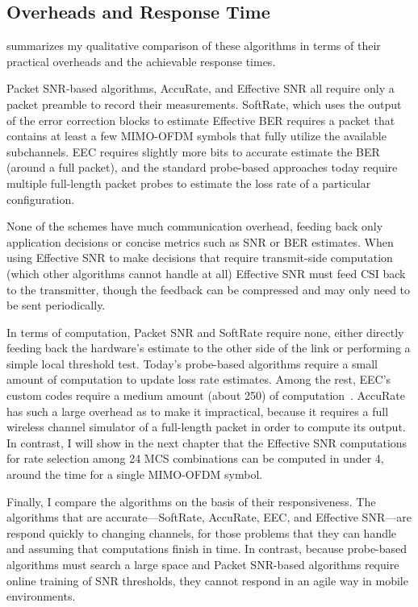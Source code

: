 \subsection{Overheads and Response Time}
 summarizes my qualitative comparison of these algorithms in terms of their practical overheads and the achievable response times.

Packet SNR-based algorithms, AccuRate, and Effective SNR all require only a packet preamble to record their measurements. SoftRate, which uses the output of the error correction blocks to estimate Effective BER requires a packet that contains at least a few MIMO-OFDM symbols that fully utilize the available subchannels. EEC requires slightly more bits to accurate estimate the BER (around a full packet), and the standard probe-based approaches today require multiple full-length packet probes to estimate the loss rate of a particular configuration.

None of the schemes have much communication overhead, feeding back only application decisions or concise metrics such as SNR or BER estimates. When using Effective SNR to make decisions that require transmit-side computation (which other algorithms cannot handle at all) Effective SNR must feed CSI back to the transmitter, though the feedback can be compressed and may only need to be sent periodically.

In terms of computation, Packet SNR and SoftRate require none, either directly feeding back the hardware's estimate to the other side of the link or performing a simple local threshold test. Today's probe-based algorithms require a small amount of computation to update loss rate estimates. Among the rest, EEC's custom codes require a medium amount (about 250\us) of computation~\cite{Chen_EEC}. AccuRate has such a large overhead as to make it impractical, because it requires a full wireless channel simulator of a full-length packet in order to compute its output. In contrast, I will show in the next chapter that the Effective SNR computations for rate selection among 24 MCS combinations can be computed in under 4\us, around the time for a single MIMO-OFDM symbol.

Finally, I compare the algorithms on the basis of their responsiveness. The algorithms that are accurate---SoftRate, AccuRate, EEC, and Effective SNR---are respond quickly to changing channels, for those problems that they can handle and assuming that computations finish in time. In contrast, because probe-based algorithms must search a large space and Packet SNR-based algorithms require online training of SNR thresholds, they cannot respond in an agile way in mobile environments.

